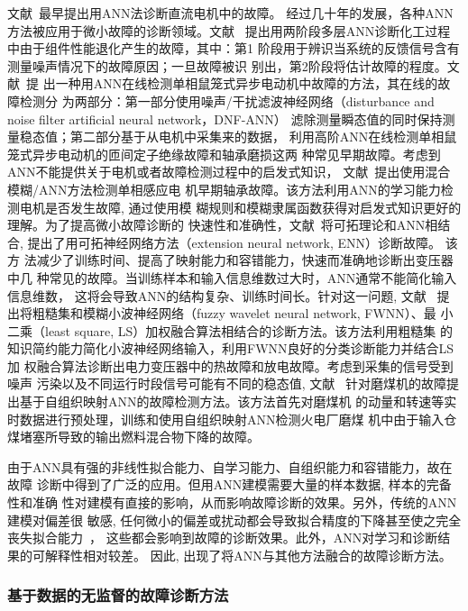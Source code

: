 文献~最早提出用ANN法诊断直流电机中的故障。
经过几十年的发展，各种ANN方法被应用于微小故障的诊断领域。文献~
提出用两阶段多层ANN诊断化工过程中由于组件性能退化产生的故障，其中：第1
阶段用于辨识当系统的反馈信号含有测量噪声情况下的故障原因；一旦故障被识
别出，第2阶段将估计故障的程度。文献~提
出一种用ANN在线检测单相鼠笼式异步电动机中故障的方法，其在线的故障检测分
为两部分：第一部分使用噪声/干扰滤波神经网络（disturbance and noise filter artificial neural network，DNF-ANN）
滤除测量瞬态值的同时保持测量稳态值；第二部分基于从电机中采集来的数据，
利用高阶ANN在线检测单相鼠笼式异步电动机的匝间定子绝缘故障和轴承磨损这两
种常见早期故障。考虑到ANN不能提供关于电机或者故障检测过程中的启发式知识，
文献~提出使用混合模糊/ANN方法检测单相感应电
机早期轴承故障。该方法利用ANN的学习能力检测电机是否发生故障, 通过使用模
糊规则和模糊隶属函数获得对启发式知识更好的理解。为了提高微小故障诊断的
快速性和准确性，文献~将可拓理论和ANN相结合,
提出了用可拓神经网络方法（extension neural network, ENN）诊断故障。 该方
法减少了训练时间、提高了映射能力和容错能力，快速而准确地诊断出变压器中几
种常见的故障。当训练样本和输入信息维数过大时，ANN通常不能简化输入信息维数，
这将会导致ANN的结构复杂、训练时间长。针对这一问题, 文献~
提出将粗糙集和模糊小波神经网络（fuzzy wavelet neural network, FWNN）、最
小二乘（least square, LS）加权融合算法相结合的诊断方法。该方法利用粗糙集
的知识简约能力简化小波神经网络输入，利用FWNN良好的分类诊断能力并结合LS加
权融合算法诊断出电力变压器中的热故障和放电故障。考虑到采集的信号受到噪声
污染以及不同运行时段信号可能有不同的稳态值, 文献~
针对磨煤机的故障提出基于自组织映射ANN的故障检测方法。该方法首先对磨煤机
的动量和转速等实时数据进行预处理，训练和使用自组织映射ANN检测火电厂磨煤
机中由于输入仓煤堵塞所导致的输出燃料混合物下降的故障。

由于ANN具有强的非线性拟合能力、自学习能力、自组织能力和容错能力，故在故障
诊断中得到了广泛的应用。但用ANN建模需要大量的样本数据, 样本的完备性和准确
性对建模有直接的影响，从而影响故障诊断的效果。另外，传统的ANN建模对偏差很
敏感, 任何微小的偏差或扰动都会导致拟合精度的下降甚至使之完全丧失拟合能力~\cite{zhangzhengdao2004ann}，
这些都会影响到故障的诊断效果。此外，ANN对学习和诊断结果的可解释性相对较差。
因此, 出现了将ANN与其他方法融合的故障诊断方法。

\subsubsection{基于数据的无监督的故障诊断方法}

